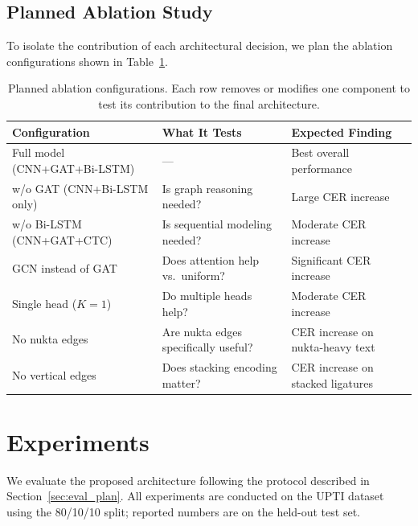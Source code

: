 \documentclass[11pt]{article}
\begin{document}
\subsection{Planned Ablation Study}

To isolate the contribution of each architectural decision, we plan the ablation
configurations shown in Table~\ref{tab:ablation_plan}.

\begin{table}[t]
\centering
\caption{Planned ablation configurations. Each row removes or modifies one component
         to test its contribution to the final architecture.}
\label{tab:ablation_plan}
\begin{tabular}{lll}
\toprule
\textbf{Configuration} & \textbf{What It Tests} & \textbf{Expected Finding} \\
\midrule
Full model (CNN+GAT+Bi-LSTM)  & ---                                    & Best overall performance \\
w/o GAT (CNN+Bi-LSTM only)    & Is graph reasoning needed?             & Large CER increase \\
w/o Bi-LSTM (CNN+GAT+CTC)     & Is sequential modeling needed?         & Moderate CER increase \\
GCN instead of GAT            & Does attention help vs.\ uniform?      & Significant CER increase \\
Single head ($K=1$)           & Do multiple heads help?                & Moderate CER increase \\
No nukta edges                & Are nukta edges specifically useful?   & CER increase on nukta-heavy text \\
No vertical edges             & Does stacking encoding matter?         & CER increase on stacked ligatures \\
\bottomrule
\end{tabular}
\end{table}

\section{Experiments}
\label{sec:experiments}

We evaluate the proposed architecture following the protocol described in
Section~\ref{sec:eval_plan}.
All experiments are conducted on the UPTI dataset using the 80/10/10 split;
reported numbers are on the held-out test set.
\end{document}

